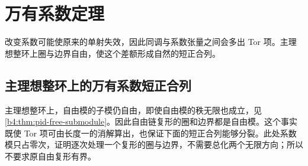
\section{万有系数定理}
\label{b4:sec:0903}

改变系数可能使原来的单射失效，因此同调与系数张量之间会多出 Tor 项。主理想整环上圈与边界自由，使这个差额形成自然的短正合列。

%
%

\subsection{主理想整环上的万有系数短正合列}
\label{b4:subsec:0903:01}

主理想整环上，自由模的子模仍自由，即使自由模的秩无限也成立，见\cref{b4:thm:pid-free-submodule}。因此自由链复形的圈和边界都是自由模。这个事实既使 Tor 项可由长度一的消解算出，也保证下面的短正合列能够分裂。此处系数模只占零次，证明逐次处理一个复形的圈与边界，不需要总化两个无限方向；所以不要求原自由复形有界。


